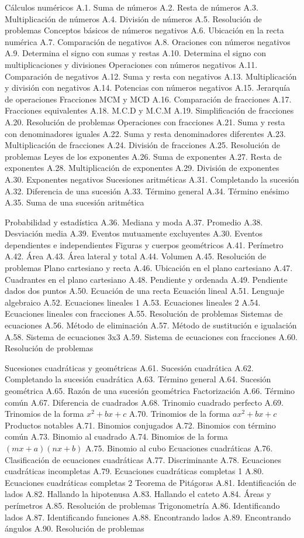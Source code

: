 Cálculos numéricos
A.1.  Suma de números
A.2.  Resta de números
A.3.  Multiplicación de números
A.4.  División de números
A.5.  Resolución de problemas
Conceptos básicos de números negativos
A.6.  Ubicación en la recta numérica
A.7.  Comparación de negativos
A.8.  Oraciones con números negativos
A.9.  Determina el signo con sumas y restas
A.10. Determina el signo con multiplicaciones y divisiones
Operaciones con números negativos
A.11. Comparación de negativos
A.12. Suma y resta con negativos
A.13. Multiplicación y división con negativos
A.14. Potencias con números negativos
A.15. Jerarquía de operaciones
Fracciones MCM y MCD
A.16. Comparación de fracciones
A.17. Fracciones equivalentes
A.18. M.C.D y M.C.M
A.19. Simplificación de fracciones
A.20. Resolución de problemas
Operaciones con fracciones 
A.21. Suma y resta con denominadores iguales
A.22. Suma y resta denominadores diferentes
A.23. Multiplicación de fracciones
A.24. División de fracciones
A.25. Resolución de problemas
Leyes de los exponentes
A.26. Suma de exponentes
A.27. Resta de exponentes
A.28. Multiplicación de exponentes
A.29. División de exponentes
A.30. Exponentes negativos
Sucesiones aritméticas
A.31. Completando la sucesión
A.32. Diferencia de una sucesión
A.33. Término general
A.34. Término enésimo
A.35. Suma de una sucesión aritmética

Probabilidad y estadística
A.36. Mediana y moda
A.37. Promedio
A.38. Desviación media
A.39. Eventos mutuamente excluyentes
A.30. Eventos dependientes e independientes
Figuras y cuerpos geométricos
A.41. Perímetro
A.42. Área
A.43. Área lateral y total
A.44. Volumen
A.45. Resolución de problemas
Plano cartesiano y recta
A.46. Ubicación en el plano cartesiano
A.47. Cuadrantes en el plano cartesiano
A.48. Pendiente y ordenada
A.49. Pendiente dados dos puntos
A.50. Ecuación de una recta
Ecuación lineal
A.51. Lenguaje algebraico
A.52. Ecuaciones lineales 1
A.53. Ecuaciones lineales 2
A.54. Ecuaciones lineales con fracciones
A.55. Resolución de problemas
Sistemas de ecuaciones
A.56. Método de eliminación
A.57. Método de sustitución e igualación
A.58. Sistema de ecuaciones 3x3
A.59. Sistema de ecuaciones con fracciones
A.60. Resolución de problemas

Sucesiones cuadráticas y geométricas
A.61. Sucesión cuadrática
A.62. Completando la sucesión cuadrática
A.63. Término general
A.64. Sucesión geométrica
A.65. Razón de una sucesión geométrica
Factorización
A.66. Término común
A.67. Diferencia de cuadrados
A.68. Trinomio cuadrado perfecto
A.69. Trinomios de la forma $x^2+bx+c$
A.70. Trinomios de la forma $ax^2+bx+c$
Productos notables
A.71. Binomios conjugados
A.72. Binomios con término común
A.73. Binomio al cuadrado
A.74. Binomios de la forma $(mx+a)(nx+b)$
A.75. Binomio al cubo
Ecuaciones cuadráticas
A.76. Clasificación de ecuaciones cuadráticas
A.77. Discriminante
A.78. Ecuaciones cuadráticas incompletas
A.79. Ecuaciones cuadráticas completas 1
A.80. Ecuaciones cuadráticas completas 2
Teorema de Pitágoras
A.81. Identificación de lados
A.82. Hallando la hipotenusa
A.83. Hallando el cateto
A.84. Áreas y perímetros
A.85. Resolución de problemas
Trigonometría
A.86. Identificando lados
A.87. Identificando funciones
A.88. Encontrando lados
A.89. Encontrando ángulos
A.90. Resolución de problemas